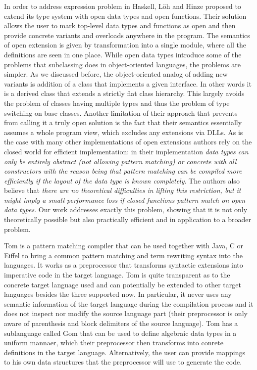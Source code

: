 \documentclass[preprint]{sigplanconf}
\begin{document}
In order to address expression problem in Haskell, L\"{o}h and Hinze proposed to 
extend its type system with open data types and open functions\cite{LohHinze2006}.
Their solution allows the user to mark top-level data types and functions as 
open and then provide concrete variants and overloads anywhere in the program. 
The semantics of open extension is given by transformation into a single module, 
where all the definitions are seen in one place. While open data types introduce 
some of the problems that subclassing does in object-oriented languages, the 
problems are simpler. As we discussed before, the object-oriented analog of 
adding new variants is addition of a class that implements a given interface. In 
other words it is a derived class that extends a strictly flat class hierarchy. 
This largely avoids the problem of classes having multiple types and thus the 
problem of type switching on base classes. Another limitation of their approach 
that prevents from calling it a truly open solution is the fact that their 
semantics essentially assumes a whole program view, which excludes any 
extensions via DLLs. As is the case with many other implementations of open 
extensions authors rely on the closed world for efficient implementation: in 
their implementation \emph{data types can only be entirely abstract (not 
allowing pattern matching) or concrete with all constructors with the reason 
being that pattern matching can be compiled more efficiently if the layout of 
the data type is known completely}. The authors also believe that \emph{there 
are no theoretical difficulties in lifting this restriction, but it might imply 
a small performance loss if closed functions pattern match on open data types}. 
Our work addresses exactly this problem, showing that it is not only 
theoretically possible but also practically efficient and in application to a 
broader problem.

Tom is a pattern matching compiler that can be used together with Java, C or 
Eiffel to bring a common pattern matching and term rewriting syntax into the 
languages\cite{Moreau:2003}. It works as a preprocessor that transforms 
syntactic extensions into imperative code in the target language. Tom is quite 
transparent as to the concrete target language used and can potentially be 
extended to other target languages besides the three supported now. In 
particular, it never uses any semantic information of the target language during 
the compilation process and it does not inspect nor modify the source language 
part (their preprocessor is only aware of parenthesis and block delimiters of 
the source language). Tom has a sublanguage called Gom that can be used to 
define algebraic data types in a uniform mannaer, which their preprocessor then 
transforms into conrete definitions in the target language. Alternatively, the 
user can provide mappings to his own data structures that the preprocessor will 
use to generate the code.
\end{document}
